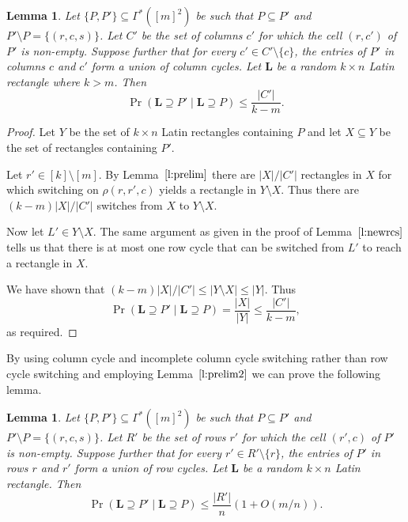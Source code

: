 \documentclass[12pt]{article}
\newtheorem{lem}[thm]{Lemma}
\theoremstyle{definition}
\numberwithin{equation}{section}
\def\lref#1{Lemma~$\ref{#1}$}
\renewcommand{\leq}{\leqslant}
\renewcommand{\L}{\mathbf{L}}
\begin{document}
	\begin{lem}\label{l:colcycs}
		Let $\{P, P'\} \subseteq \Gamma^*([m]^2)$ be such that $P \subseteq
		P'$ and $P' \setminus P = \{(r, c, s)\}$. Let $C'$ be the set of
		columns $c'$ for which the cell $(r, c')$ of $P'$ is
		non-empty. Suppose further that for every $c' \in C'\setminus\{c\}$,
		the entries of $P'$ in columns $c$ and $c'$ form a
		union of column cycles. Let $\L$ be a random $k \times n$ Latin
		rectangle where $k>m$. Then
		\[
		\Pr(\L \supseteq P' \mid  \L \supseteq P) \leq \frac{|C'|}{k-m}.
		\]
	\end{lem}
	
	\begin{proof}
		Let $Y$ be the set of $k \times n$ Latin rectangles containing $P$ and
		let $X \subseteq Y$ be the set of rectangles containing $P'$.
		
		Let $r' \in [k]\setminus [m]$. By \lref{l:prelim} there are 
		$|X|/|C'|$ rectangles in $X$ for which switching on $\rho(r, r', c)$
		yields a rectangle in $Y \setminus X$. Thus there are 
		$(k-m)|X|/|C'|$ switches from $X$ to $Y \setminus X$.
		
		Now let $L' \in Y \setminus X$. The same argument as given in the
		proof of \lref{l:newrcs} tells us that there is at most one row cycle
		that can be switched from $L'$ to reach a rectangle in $X$.
		
		We have shown that $(k-m)|X|/|C'| \leq |Y \setminus X| \leq |Y|$. Thus
		\[
		\Pr(\L \supseteq P' \mid  \L \supseteq P) = \frac{|X|}{|Y|} \leq \frac{|C'|}{k-m},
		\]
		as required.
	\end{proof}
	
	By using column cycle and incomplete column cycle switching rather
	than row cycle switching and employing \lref{l:prelim2} we can prove
	the following lemma.
	
	\begin{lem}\label{l:rowcycs}
		Let $\{P, P'\} \subseteq \Gamma^*([m]^2)$ be such that $P \subseteq
		P'$ and $P' \setminus P = \{(r, c, s)\}$. Let $R'$ be the set of
		rows $r'$ for which the cell $(r', c)$ of $P'$ is non-empty. Suppose
		further that for every $r' \in R' \setminus \{r\}$, the entries of
		$P'$ in rows $r$ and $r'$ form a union of row cycles. Let $\L$ be a
		random $k \times n$ Latin rectangle. Then
		\[
		\Pr(\L \supseteq P' \mid  \L \supseteq P) \leq \frac{|R'|}n(1+O(m/n)).
		\]
	\end{lem}
	
\end{document}
